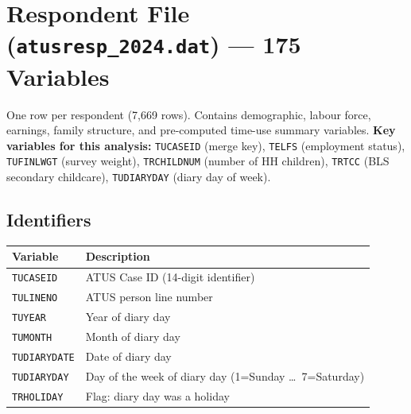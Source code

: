 \documentclass[11pt, a4paper]{article}
\begin{document}
\vspace{10pt}
\tableofcontents
\newpage

\section{Respondent File (\texttt{atusresp\_2024.dat}) --- 175 Variables}

\begin{tcolorbox}[notebox] One row per respondent (7{,}669 rows). Contains demographic, labour force,
earnings, family structure, and pre-computed time-use summary variables.
\textbf{Key variables for this analysis:} \texttt{TUCASEID} (merge key),
\texttt{TELFS} (employment status), \texttt{TUFINLWGT} (survey weight),
\texttt{TRCHILDNUM} (number of HH children), \texttt{TRTCC} (BLS secondary
childcare), \texttt{TUDIARYDAY} (diary day of week).
\end{tcolorbox}

\subsection{Identifiers}
\begin{longtable}{L{3.5cm} L{12cm}}
\toprule \textbf{Variable} & \textbf{Description} \\ \midrule \endhead
\bottomrule \endfoot
\texttt{TUCASEID}   & ATUS Case ID (14-digit identifier) \\
 \texttt{TULINENO}   & ATUS person line number \\
\texttt{TUYEAR}     & Year of diary day \\
 \texttt{TUMONTH}    & Month of diary day \\
\texttt{TUDIARYDATE}& Date of diary day \\
 \texttt{TUDIARYDAY} & Day of the week of diary day (1=Sunday \ldots\ 7=Saturday) \\
\texttt{TRHOLIDAY}  & Flag: diary day was a holiday \\
\end{longtable}

\end{document}
